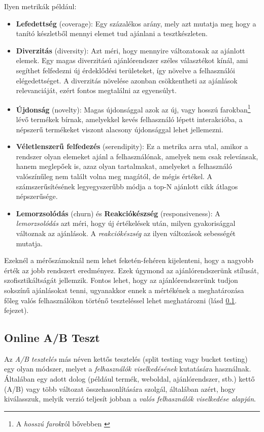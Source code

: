 \documentclass[
]{thesis-ekf}
\theoremstyle{definition}
\theoremstyle{remark}
\begin{document}
Ilyen metrikák például:
\begin{itemize}
	\item \textbf{Lefedettség} (coverage): Egy százalékos arány, mely azt mutatja meg hogy a tanító készletből mennyi elemet tud ajánlani a tesztkészleten.\cite{evaluation-metrics-for-rec-sys}
	\item \textbf{Diverzitás} (diversity): Azt méri, hogy mennyire változatosak az ajánlott elemek. Egy magas diverzitású ajánlórendszer széles választékot kínál, ami segíthet felfedezni új érdeklődési területeket, így növelve a felhasználói elégedettséget. A diverzitás növelése azonban csökkentheti az ajánlások relevanciáját, ezért fontos megtalálni az egyensúlyt.
	\item \textbf{Újdonság} (novelty): Magas újdonsággal azok az új, vagy hosszú farokban\footnote{A \emph{hosszú farok}ról bővebben \cite{wiki-hosszu-farok}} lévő termékek bírnak, amelyekkel kevés felhasználó lépett interakcióba, a népszerű termékeket viszont alacsony újdonsággal lehet jellemezni.\cite{journal-the-definition-of-novelty-in-rec-systems}
	\item \textbf{Véletlenszerű felfedezés} (serendipity): Ez a metrika arra utal, amikor a rendszer olyan elemeket ajánl a felhasználónak, amelyek nem csak relevánsak, hanem meglepőek is, azaz olyan tartalmakat, amelyeket a felhasználó valószínűleg nem talált volna meg magától, de mégis értékel. A számszerűsítésének legyegyszerűbb módja a top-N ajánlott cikk átlagos népszerűsége.\cite{linkedin:serendipity}
	\item \textbf{Lemorzsolódás} (churn) és \textbf{Reakciókészség} (responsiveness): A \emph{lemorzsolódás} azt méri, hogy új értékelések után, milyen gyakorisággal változnak az ajánlások. A \emph{reakciókészség} az ilyen változások sebességét mutatja. \cite{recommender-systems-machine-learning-metrics-and-business-metrics}
\end{itemize}

Ezeknél a mérőszámoknál nem lehet feketén-fehéren kijelenteni, hogy a nagyobb érték az jobb rendszert eredményez. Ezek úgymond az ajánlórendszerünk stílusát, szofisztikáltságát jellemzik. Fontos lehet, hogy az ajánlórendszerünk tudjon sokszínű ajánlásokat tenni, ugyanakkor ennek a mértékének a meghatározása főleg valós felhasználókon történő teszteléssel lehet meghatározni (lásd \ref{a/b-teszteles}. fejezet).

\subsection{Online A/B Teszt}
\label{a/b-teszteles}
Az \emph{A/B tesztelés} más néven kettős tesztelés (split testing vagy bucket testing) egy olyan módszer, melyet a \emph{felhasználók viselkedésének} kutatására használnak. Általában egy adott dolog (például termék, weboldal, ajánlórendszer, stb.) kettő (A/B) vagy több változat összehasonlítására szolgál, általában azért, hogy kiválasszuk, melyik verzió teljesít jobban a \emph{valós felhasználók viselkedése alapján}.\cite{wiki-a/b-testing}
\end{document}

